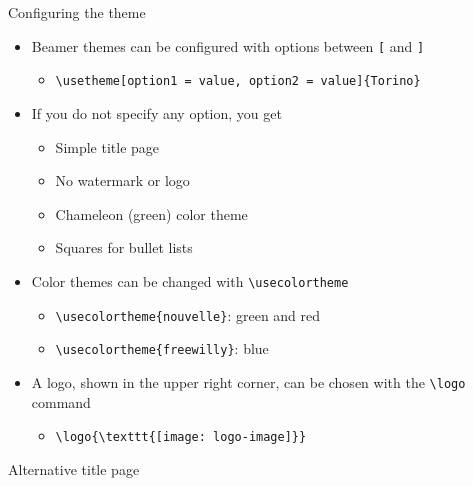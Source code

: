 \begin{frame}[t,fragile]{Configuring the theme}
\begin{itemize}
\item Beamer themes can be configured with options between \verb![! and
      \verb!]!
  \begin{itemize}
  \item \verb!\usetheme[option1 = value, option2 = value]{Torino}!
  \end{itemize}
\item If you do not specify any option, you get
  \begin{itemize}
  \item Simple title page
  \item No watermark or logo
  \item Chameleon (green) color theme
  \item Squares for bullet lists
  \end{itemize}
\item Color themes can be changed with \verb!\usecolortheme!
  \begin{itemize}
  \item \verb!\usecolortheme{nouvelle}!: green and red
  \item \verb!\usecolortheme{freewilly}!: blue
  \end{itemize}
\item A logo, shown in the upper right corner, can be chosen with the
      \verb!\logo! command
  \begin{itemize}
  \item \verb!\logo{\texttt{[image: logo-image]}}!
  \end{itemize}
\end{itemize}
\end{frame}

\begin{frame}[t,fragile]{Alternative title page}
\end{frame}

